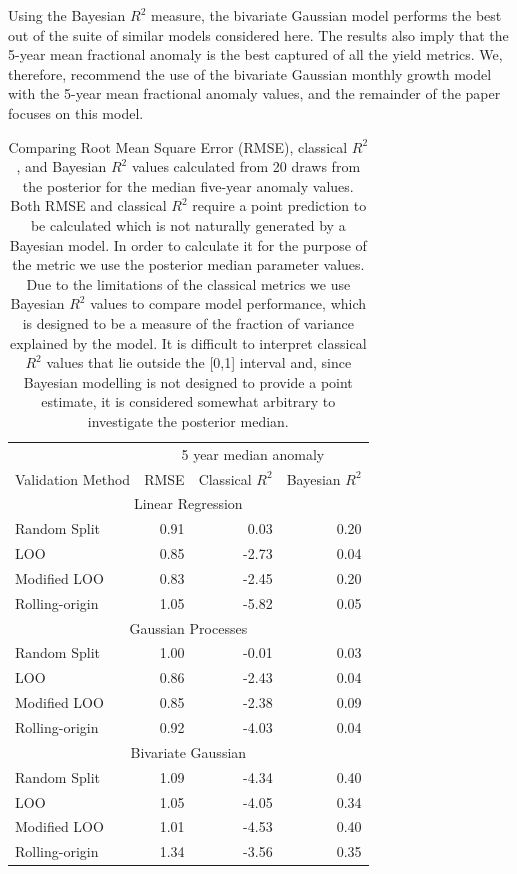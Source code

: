 \documentclass[12pt]{iopart}
\newcommand{\remove}[1]{}
\newcommand{\add}[1]{#1}
\begin{document}
Using the Bayesian $R^2$ measure, the bivariate Gaussian model performs the best out of the suite of similar models considered here. The results also imply that the 5-year mean fractional anomaly is the best captured of all the yield metrics. We, therefore, recommend the use of the bivariate Gaussian monthly growth model with the 5-year mean fractional anomaly values, and the remainder of the paper focuses on this model.

\begin{table}[]
\small
\centering
\caption{Comparing Root Mean Square Error (RMSE), classical $R^2$, and Bayesian $R^2$ values calculated from 20 draws from the posterior for the median five-year anomaly values. \add{Both RMSE and classical $R^2$ require a point prediction to be calculated which is not naturally generated by a Bayesian model. In order to calculate it for the purpose of the metric we use the posterior median parameter values.} \remove{Based on these comparisons}\add{Due to the limitations of the classical metrics} we use Bayesian $R^2$ values to compare model performance, which is designed to be a measure of the fraction of variance explained by the model. It is difficult to interpret classical $R^2$ values that lie outside the [0,1] interval and, since Bayesian modelling is not designed to provide a point estimate, it is considered somewhat arbitrary to investigate the posterior median.}
\label{table:cv_results_clas_bayes}
\vskip 0.15in
\begin{tabular}{lrrr}
\hline
 & \multicolumn{3}{c}{5 year median anomaly}  \\
Validation Method   & RMSE   & Classical $R^2$  & Bayesian $R^2$   \\ \hline

\multicolumn{4}{c}{Linear Regression}    \\ \hline
Random Split        & 0.91   & 0.03   &  0.20 \\
LOO                 & 0.85   & -2.73  &  0.04 \\
Modified LOO        & 0.83   & -2.45  &  0.20 \\
Rolling-origin      & 1.05   & -5.82  &  0.05 \\ \hline
\multicolumn{4}{c}{Gaussian Processes}   \\ \hline
Random Split        & 1.00   & -0.01  &  0.03 \\
LOO                 & 0.86   & -2.43  &  0.04 \\
Modified LOO        & 0.85   & -2.38  &  0.09 \\
Rolling-origin      & 0.92   & -4.03  &  0.04 \\ \hline
\multicolumn{4}{c}{Bivariate Gaussian}   \\ 
\hline
Random Split        & 1.09   & -4.34  &  0.40 \\
LOO                 & 1.05   & -4.05  &  0.34 \\
Modified LOO        & 1.01   & -4.53  &  0.40 \\
Rolling-origin      & 1.34   & -3.56  &  0.35 \\ \hline
\end{tabular}
\end{table}
\end{document}
